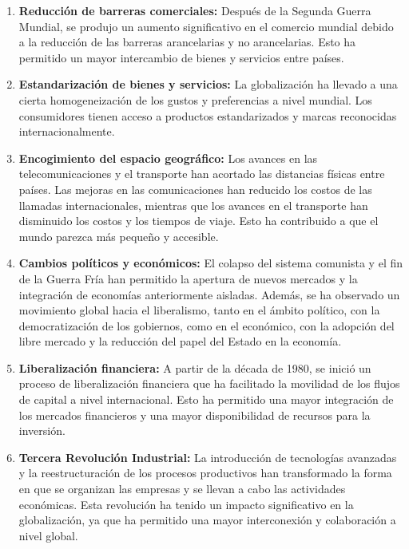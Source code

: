 \documentclass[
  letterpaper,
  DIV=11,
  numbers=noendperiod]{scrartcl}
\begin{document}
\begin{enumerate}
\def\labelenumi{\arabic{enumi}.}
\item
  \textbf{Reducción de barreras comerciales:} Después de la Segunda
  Guerra Mundial, se produjo un aumento significativo en el comercio
  mundial debido a la reducción de las barreras arancelarias y no
  arancelarias. Esto ha permitido un mayor intercambio de bienes y
  servicios entre países.
\item
  \textbf{Estandarización de bienes y servicios:} La globalización ha
  llevado a una cierta homogeneización de los gustos y preferencias a
  nivel mundial. Los consumidores tienen acceso a productos
  estandarizados y marcas reconocidas internacionalmente.
\item
  \textbf{Encogimiento del espacio geográfico:} Los avances en las
  telecomunicaciones y el transporte han acortado las distancias físicas
  entre países. Las mejoras en las comunicaciones han reducido los
  costos de las llamadas internacionales, mientras que los avances en el
  transporte han disminuido los costos y los tiempos de viaje. Esto ha
  contribuido a que el mundo parezca más pequeño y accesible.
\item
  \textbf{Cambios políticos y económicos:} El colapso del sistema
  comunista y el fin de la Guerra Fría han permitido la apertura de
  nuevos mercados y la integración de economías anteriormente aisladas.
  Además, se ha observado un movimiento global hacia el liberalismo,
  tanto en el ámbito político, con la democratización de los gobiernos,
  como en el económico, con la adopción del libre mercado y la reducción
  del papel del Estado en la economía.
\item
  \textbf{Liberalización financiera:} A partir de la década de 1980, se
  inició un proceso de liberalización financiera que ha facilitado la
  movilidad de los flujos de capital a nivel internacional. Esto ha
  permitido una mayor integración de los mercados financieros y una
  mayor disponibilidad de recursos para la inversión.
\item
  \textbf{Tercera Revolución Industrial:} La introducción de tecnologías
  avanzadas y la reestructuración de los procesos productivos han
  transformado la forma en que se organizan las empresas y se llevan a
  cabo las actividades económicas. Esta revolución ha tenido un impacto
  significativo en la globalización, ya que ha permitido una mayor
  interconexión y colaboración a nivel global.
\end{enumerate}
\end{document}
